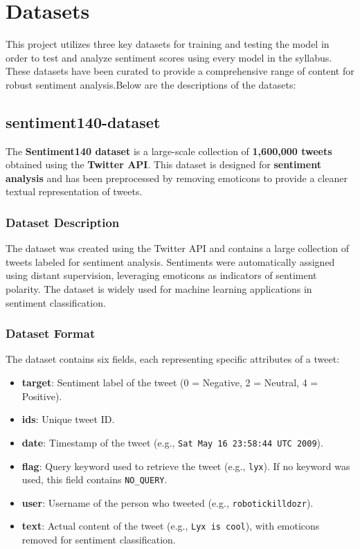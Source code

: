 \section{Datasets}

This project utilizes three key datasets for training and testing the model in order to test and analyze sentiment scores using every model in the syllabus. These datasets have been curated to provide a comprehensive range of content for robust sentiment analysis.Below are the descriptions of the datasets:

\subsection{sentiment140-dataset}

The \textbf{Sentiment140 dataset} is a large-scale collection of \textbf{1,600,000 tweets} obtained using the \textbf{Twitter API}. This dataset is designed for \textbf{sentiment analysis} and has been preprocessed by removing emoticons to provide a cleaner textual representation of tweets.

\subsubsection{Dataset Description}

The dataset was created using the Twitter API and contains a large collection of tweets labeled for sentiment analysis. Sentiments were automatically assigned using distant supervision, leveraging emoticons as indicators of sentiment polarity. The dataset is widely used for machine learning applications in sentiment classification.

\subsubsection{Dataset Format}

The dataset contains six fields, each representing specific attributes of a tweet:

\begin{itemize}
    \item \textbf{target}: Sentiment label of the tweet (0 = Negative, 2 = Neutral, 4 = Positive).
    \item \textbf{ids}: Unique tweet ID.
    \item \textbf{date}: Timestamp of the tweet (e.g., \texttt{Sat May 16 23:58:44 UTC 2009}).
    \item \textbf{flag}: Query keyword used to retrieve the tweet (e.g., \texttt{lyx}). If no keyword was used, this field contains \texttt{NO\_QUERY}.
    \item \textbf{user}: Username of the person who tweeted (e.g., \texttt{robotickilldozr}).
    \item \textbf{text}: Actual content of the tweet (e.g., \texttt{Lyx is cool}), with emoticons removed for sentiment classification.
\end{itemize}

